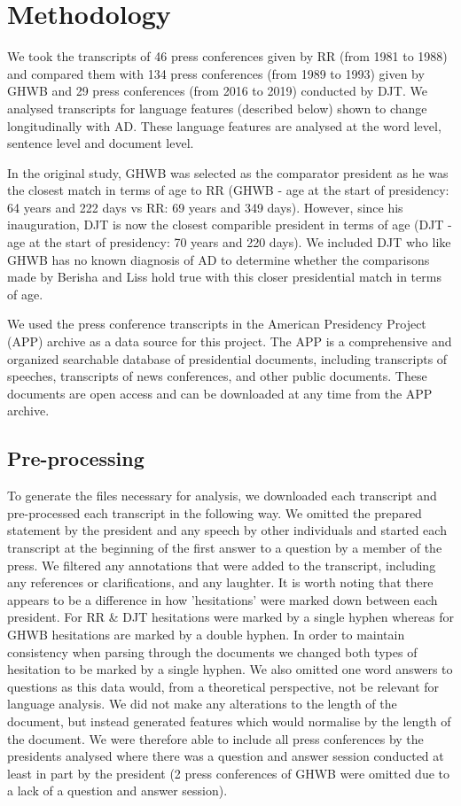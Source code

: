 \documentclass[12pt]{article}
\begin{document}
\section{Methodology}\label{methodology}
We took the transcripts of 46 press conferences given by RR (from 1981 to 1988) and compared them with 134 press conferences (from 1989 to 1993) given by GHWB and 29 press conferences (from 2016 to 2019) conducted by DJT.  We analysed transcripts for language features (described below) shown to change longitudinally with AD. These language features are analysed at the word level, sentence level and document level. 
\par 
In the original study, GHWB was selected as the comparator president as he was the closest match in terms of age to RR (GHWB - age at the start of presidency: 64 years and 222 days vs RR: 69 years and 349 days). However, since his inauguration, DJT is now the closest comparible president in terms of age (DJT - age at the start of presidency: 70 years and 220 days). We included DJT who like GHWB has no known diagnosis of AD to determine whether the comparisons made by Berisha and Liss hold true with this closer presidential match in terms of age. 
\par 
We used the press conference transcripts in the American Presidency Project (APP) archive as a data source for this project. The APP is a comprehensive and organized searchable database of presidential documents, including transcripts of speeches, transcripts of news conferences, and other public documents. These documents are open access and can be downloaded at any time from the APP archive.

\subsection{Pre-processing}
To generate the files necessary for analysis, we downloaded each transcript and pre-processed each transcript in the following way. We omitted the prepared statement by the president and any speech by other individuals and started each transcript at the beginning of the first answer to a question by a member of the press. We filtered any annotations that were added to the transcript, including any references or clarifications, and any laughter. It is worth noting that there appears to be a difference in how 'hesitations' were marked down between each president. For RR \& DJT hesitations were marked by a single hyphen whereas for GHWB hesitations are marked by a double hyphen. In order to maintain consistency when parsing through the documents we changed both types of hesitation to be marked by a single hyphen. We also omitted one word answers to questions as this data would, from a theoretical perspective, not be relevant for language analysis. We did not make any alterations to the length of the document, but instead generated features which would normalise by the length of the document. We were therefore able to include all press conferences by the presidents analysed where there was a question and answer session conducted at least in part by the president (2 press conferences of GHWB were omitted due to a lack of a question and answer session).
\end{document}
